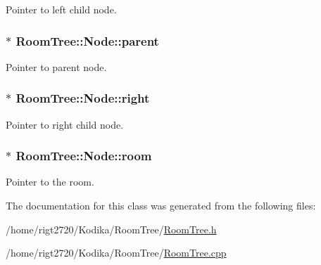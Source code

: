 Pointer to left child node. 

\hypertarget{classRoomTree_1_1Node_af9ac8d99a8290e915138b944f967da2c}{
\subsubsection[{parent}]{$\ast$ Room\-Tree\-::\-Node\-::parent}}\label{classRoomTree_1_1Node_af9ac8d99a8290e915138b944f967da2c}


Pointer to parent node. 

\hypertarget{classRoomTree_1_1Node_af770714f2bca461a776bb53feb82650c}{
\subsubsection[{right}]{$\ast$ Room\-Tree\-::\-Node\-::right}}\label{classRoomTree_1_1Node_af770714f2bca461a776bb53feb82650c}


Pointer to right child node. 

\hypertarget{classRoomTree_1_1Node_a4f39bdd1110291bf2e6eb14469f9b1e3}{
\subsubsection[{room}]{$\ast$ Room\-Tree\-::\-Node\-::room}}\label{classRoomTree_1_1Node_a4f39bdd1110291bf2e6eb14469f9b1e3}


Pointer to the room. 



The documentation for this class was generated from the following files\-:\begin{DoxyCompactItemize}
\item 
/home/rigt2720/\-Kodika/\-Room\-Tree/\hyperlink{RoomTree_8h}{Room\-Tree.\-h}\item 
/home/rigt2720/\-Kodika/\-Room\-Tree/\hyperlink{RoomTree_8cpp}{Room\-Tree.\-cpp}\end{DoxyCompactItemize}
